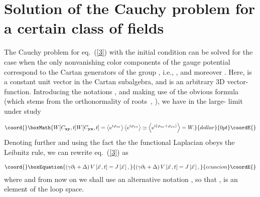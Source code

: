\documentclass[a4paper,12pt]{article}
\begin{document}
\section{Solution of the Cauchy problem for a certain class of fields}

The Cauchy problem for eq.~(\ref{3}) with the initial condition \coordHE{} can be solved for the case when the
only nonvanishing color components of the gauge potential correspond to the Cartan generators
\coordHE{} of the group \coordHE{}, i.e., \coordHE{}, and moreover \coordHE{}. Here,
\coordHE{} is a constant unit vector in the Cartan subalgebra, and \coordHE{} is an arbitrary 3D vector-function.
Introducing the notations \coordHE{},
\coordHE{} and making use of the obvious formula
\coordHE{} (which stems from the orthonormality of roots~\cite{group},
\coordHE{}), we have in the large-\coordHE{} limit under study

$$\coord{}\boxMath{W[C_{\bf xy},t]W[C_{\bf yx},t]=\left<{\rm e}^{i\varphi_{\rm xy}}\right>\left<{\rm e}^{i\varphi_{\rm yx}}\right>
\simeq\left<{\rm e}^{i\left(\varphi_{\rm xy}+\varphi_{\rm yx}\right)}\right>=W.}{dollar}{0pt}\coordE{}$$
Denoting further \coordHE{} and using the fact the the functional Laplacian obeys the Leibnitz rule, we can rewrite
eq.~(\ref{3}) as

\begin{equation}\coord{}\boxEquation{
\label{Abel}
\left(\gamma\partial_t+\Delta\right)V\left[\vec x{\,},t\right]=J\left[{\vec x}{\,}\right],
}{
\left(\gamma\partial_t+\Delta\right)V\left[\vec x{\,},t\right]=J\left[{\vec x}{\,}\right],
}{ecuacion}\coordE{}\end{equation}
where \coordHE{} and from now on we shall use
an alternative notation \coordHE{}, so that \coordHE{}, \coordHE{}
is an element of the loop space.
\end{document}
